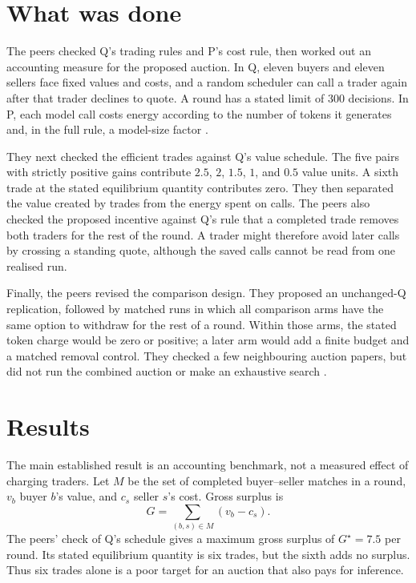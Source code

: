 \documentclass{article}
\begin{document}
\section{What was done}

The peers checked Q's trading rules and P's cost rule, then worked out an accounting measure for the
proposed auction. In Q, eleven buyers and eleven sellers face fixed values and costs, and a random
scheduler can call a trader again after that trader declines to quote. A round has a stated limit of
300 decisions. In P, each model call costs energy according to the number of tokens it generates
and, in the full rule, a model-size factor \cite{Q,P}.

They next checked the efficient trades against Q's value schedule. The five pairs with strictly
positive gains contribute \(2.5\), \(2\), \(1.5\), \(1\), and \(0.5\) value units. A sixth trade at
the stated equilibrium quantity contributes zero. They then separated the value created by trades
from the energy spent on calls. The peers also checked the proposed incentive against Q's rule that
a completed trade removes both traders for the rest of the round. A trader might therefore avoid
later calls by crossing a standing quote, although the saved calls cannot be read from one realised
run.

Finally, the peers revised the comparison design. They proposed an unchanged-Q replication, followed
by matched runs in which all comparison arms have the same option to withdraw for the rest of a
round. Within those arms, the stated token charge would be zero or positive; a later arm would add a
finite budget and a matched removal control. They checked a few neighbouring auction papers, but did
not run the combined auction or make an exhaustive search \cite{Agora,DALA,Bandwidth,TokenStudy}.

\section{Results}

The main established result is an accounting benchmark, not a measured effect of charging traders.
Let \(M\) be the set of completed buyer--seller matches in a round, \(v_b\) buyer \(b\)'s value, and
\(c_s\) seller \(s\)'s cost. Gross surplus is
\[
G=\sum_{(b,s)\in M}(v_b-c_s).
\]
The peers' check of Q's schedule gives a maximum gross surplus of \(G^{\star}=7.5\) per round. Its
stated equilibrium quantity is six trades, but the sixth adds no surplus. Thus six trades alone is a
poor target for an auction that also pays for inference.
\end{document}
